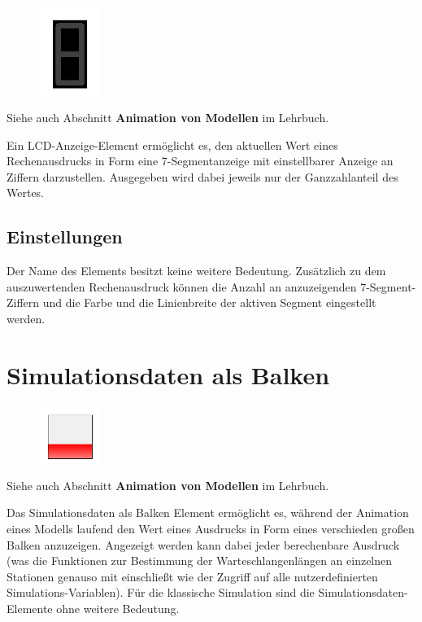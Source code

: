 \begin{figure}
\vspace{-22pt}
\includegraphics[width=2cm]{imageModelElementAnimationLCD.png}
\vspace{-22pt}
\end{figure}

Siehe auch Abschnitt \textbf{Animation von Modellen} im Lehrbuch.

Ein LCD-Anzeige-Element ermöglicht es, den aktuellen Wert eines Rechenausdrucks
in Form eine 7-Segmentanzeige mit einstellbarer Anzeige an Ziffern darzustellen.
Ausgegeben wird dabei jeweils nur der Ganzzahlanteil des Wertes.

\subsection*{Einstellungen}

Der Name des Elements besitzt keine weitere Bedeutung.
Zusätzlich zu dem auszuwertenden Rechenausdruck können
die Anzahl an anzuzeigenden 7-Segment-Ziffern und die
Farbe und die Linienbreite der aktiven Segment eingestellt werden.


\section{Simulationsdaten als Balken}
\label{ref:ModelElementAnimationBar}

\begin{figure}
\vspace{-22pt}
\includegraphics[width=2cm]{imageModelElementAnimationBar.png}
\vspace{-22pt}
\end{figure}

Siehe auch Abschnitt \textbf{Animation von Modellen} im Lehrbuch.

Das Simulationsdaten als Balken Element ermöglicht es, während der Animation eines Modells laufend den Wert
eines Ausdrucks in Form eines verschieden großen Balken anzuzeigen. Angezeigt werden kann dabei jeder berechenbare
Ausdruck (was die Funktionen zur Bestimmung der Warteschlangenlängen an einzelnen Stationen genauso mit einschließt
wie der Zugriff auf alle nutzerdefinierten Simulations-Variablen). Für die klassische Simulation sind die
Simulationsdaten-Elemente ohne weitere Bedeutung.

